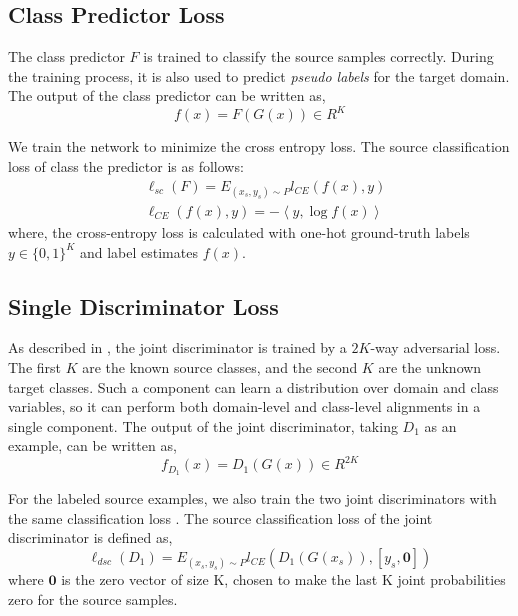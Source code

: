 \documentclass{ecai}
\begin{document}
\subsection{Class Predictor Loss}

The class predictor $F$ is trained to classify the source  samples correctly. During the training process, it is also used to predict {\emph{pseudo labels}} for the target domain. The output of the class predictor can be written as,
\begin{equation}
f(x) = F(G(x)) \in R^K
\end{equation}

We train the network to minimize the cross entropy loss. The source classification loss of class the predictor is as follows:
\begin{align}
& \ell_{sc}(F) = E_{(x_s,y_s) \sim P}l_{CE}(f(x),y) \\
& \ell_{CE}(f(x),y) = -\left<y,\log{f(x)}\right>
\end{align}
where, the cross-entropy loss is calculated with one-hot ground-truth labels $y \in \{0,1\}^K$ and label estimates $f(x)$.
\subsection{Single Discriminator Loss}
As described in \cite{b17}, the joint discriminator is trained by a $2K$-way adversarial loss. The first $K$ are the known source classes, and the second $K$ are the unknown target classes. Such a component can learn a distribution over domain and class variables, so it can perform both domain-level and class-level alignments in a single component. The output of the joint discriminator, taking $D_1$ as an example, can be written as,
\begin{equation}
f_{D_1}(x) = D_1(G(x)) \in R^{2K}
\end{equation}

For the labeled source examples, we also train the two joint discriminators with the same classification loss . The source classification loss of the joint discriminator is defined as,
\begin{equation}
\ell_{dsc}(D_1) = E_{(x_s,y_s)\sim P} l_{CE}({D_1}(G(x_s)), [y_s,\boldsymbol{0}])
\end{equation}
where $\boldsymbol{0}$ is the zero vector of size K, chosen to make the last K joint probabilities zero for the source samples.
\end{document}
